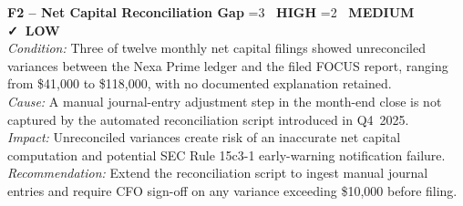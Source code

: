 \documentclass[11pt,a4paper]{scrreprt}
\newcommand{\severitytag}[1]{%
  \ifnum#1=3
    {\color{riskhigh}\bfseries\faExclamationTriangle\ HIGH}%
  \else\ifnum#1=2
    {\color{riskmed}\bfseries\faExclamationTriangle\ MEDIUM}%
  \else
    {\color{risklow}\bfseries\faCheck\ LOW}%
  \fi\fi
}
\begin{document}
\vspace{4pt}
\begin{tcolorbox}[colback=riskhigh!6,colframe=riskhigh,arc=2pt,boxrule=0.9pt,left=8pt,right=8pt,top=5pt,bottom=5pt,breakable]
\textbf{F2 -- Net Capital Reconciliation Gap} \hfill \severitytag{3}\\[3pt]
\textit{Condition:} Three of twelve monthly net capital filings showed unreconciled
variances between the Nexa Prime ledger and the filed FOCUS report, ranging from \$41,000 to
\$118,000, with no documented explanation retained.\\
\textit{Cause:} A manual journal-entry adjustment step in the month-end close is not
captured by the automated reconciliation script introduced in Q4~2025.\\
\textit{Impact:} Unreconciled variances create risk of an inaccurate net capital
computation and potential SEC Rule 15c3-1 early-warning notification failure.\\
\textit{Recommendation:} Extend the reconciliation script to ingest manual journal entries
and require CFO sign-off on any variance exceeding \$10,000 before filing.
\end{tcolorbox}
\end{document}
